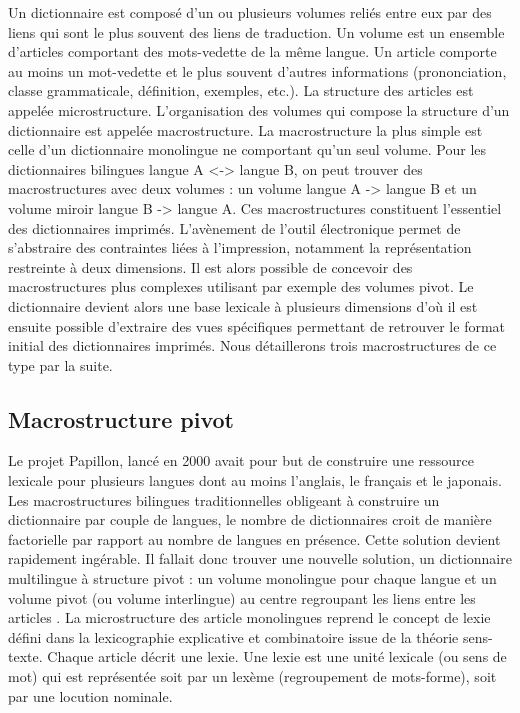 \documentclass[10pt,a4paper,twoside]{article}
\begin{document}
Un dictionnaire est composé d'un ou plusieurs volumes reliés entre eux par des liens qui sont le plus souvent des liens de traduction. Un volume est un ensemble d'articles comportant des mots-vedette de la même langue. Un article comporte au moins un mot-vedette et le plus souvent d'autres informations (prononciation, classe grammaticale, définition, exemples, etc.). La structure des articles est appelée microstructure. L'organisation des volumes qui compose la structure d'un dictionnaire est appelée macrostructure. La macrostructure la plus simple est celle d'un dictionnaire monolingue ne comportant qu'un seul volume. Pour les dictionnaires bilingues langue A <-> langue B, on peut trouver des macrostructures avec deux volumes : un volume langue A -> langue B et un volume miroir langue B -> langue A. Ces macrostructures constituent l'essentiel des dictionnaires imprimés. L'avènement de l'outil électronique permet de s'abstraire des contraintes liées à l'impression, notamment la représentation restreinte à deux dimensions. Il est alors possible de concevoir des macrostructures plus complexes utilisant par exemple des volumes pivot. Le dictionnaire devient alors une base lexicale à plusieurs dimensions d'où il est ensuite possible d'extraire des vues spécifiques permettant de retrouver le format initial des dictionnaires imprimés.
Nous détaillerons trois macrostructures de ce type par la suite.

\subsection{Macrostructure pivot}

Le projet Papillon, lancé en 2000 \cite{MTMMEP00} avait pour but de construire une ressource lexicale pour plusieurs langues dont au moins l'anglais, le français et le japonais. Les macrostructures bilingues traditionnelles obligeant à construire un dictionnaire par couple de langues, le nombre de dictionnaires croit de manière factorielle par rapport au nombre de langues en présence. Cette solution devient rapidement ingérable. Il fallait donc trouver une nouvelle solution, un dictionnaire multilingue à structure pivot : un volume monolingue pour chaque langue et un volume pivot (ou volume interlingue) au centre regroupant les liens entre les articles \cite{GSMM01a}. La microstructure des article monolingues reprend le concept de lexie défini dans la lexicographie explicative et combinatoire \cite{MelcukClasPolguere95} issue de la théorie sens-texte. Chaque article décrit une lexie. Une lexie est une unité lexicale (ou sens de mot) qui est représentée soit par un lexème (regroupement de mots-forme), soit par une locution nominale.
\end{document}
